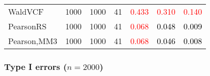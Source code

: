 \documentclass[
]{article}
\begin{document}
\begin{table}[H]
{\begin{tabular}[t]{lrrrrrr}
\hspace{1em}WaldVCF & 1000 & 1000 & 41 & \textcolor{red}{0.433} & \textcolor{red}{0.310} & \textcolor{red}{0.140}\\
\hspace{1em}PearsonRS & 1000 & 1000 & 41 & \textcolor{red}{0.068} & \textcolor{black}{0.048} & \textcolor{black}{0.009}\\
\hspace{1em}Pearson,MM3 & 1000 & 1000 & 41 & \textcolor{red}{0.068} & \textcolor{black}{0.046} & \textcolor{black}{0.008}\\
\bottomrule
\end{tabular}}
\endgroup{}
\end{table}

\hypertarget{type-i-errors-n2000-1}{%
\subsubsection{\texorpdfstring{Type I errors
(\(n=2000\))}{Type I errors (n=2000)}}\label{type-i-errors-n2000-1}}
\end{document}
